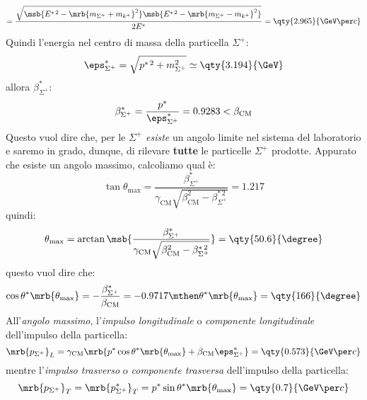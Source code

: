\begin{example}
\begin{enumerate}
\begin{equation}
			      = \frac{\sqrt{
					      \msb{E ^{\ast\,2} - \mrb{m _{\Sigma^+} + m _{k^+}}^{2}}
					      \msb{E ^{\ast\,2} - \mrb{m _{\Sigma^+} - m _{k^+}}^{2}}
				      }}{2 E^\ast} = \qty{2.965}{\GeV \per c}
		      \end{equation}
		      Quindi l'energia nel centro di massa della particella $\Sigma^+$:
		      \begin{equation}
			      \eps ^{\ast}_{\Sigma^+}
			      = \sqrt{p ^{\ast\,2} + m^2 _{\Sigma^+}}
			      \simeq \qty{3.194}{\GeV}
		      \end{equation}
		      allora $\beta ^{\ast}_{\Sigma^+}$:
		      \begin{equation}
			      \beta ^{\ast}_{\Sigma^+}
			      = \frac{p^\ast}{\eps ^{\ast}_{\Sigma^+}}
			      = 0.9283
			      < \beta _{\text{CM}}
		      \end{equation}
		      Questo vuol dire che, per le $\Sigma^+$ \textit{esiste} un angolo
		      limite nel sistema del laboratorio e saremo in grado, dunque, di
		      rilevare \textbf{tutte} le particelle $\Sigma^+$ prodotte.
		      Appurato che esiste un angolo massimo, calcoliamo qual è:
		      \begin{equation}
			      \tan \theta _\text{max}
			      = \frac{\beta _{\Sigma^+}^{\ast}}{
				      \gamma _\text{CM} \sqrt{\beta _\text{CM}^{2}
					      - \beta ^{\ast\,2} _{\Sigma^+}}
			      }
			      = 1.217
		      \end{equation}
		      quindi:
		      \begin{equation}
			      \theta _\text{max}
			      = \arctan \msb{\frac{\beta _{\Sigma^+}^{\ast}}
				      {\gamma _\text{CM} \sqrt{\beta _\text{CM}^{2}
						      - \beta ^{\ast\,2} _{\Sigma^+}}}}
			      = \qty{50.6}{\degree}
		      \end{equation}
		      questo vuol dire che:
		      \begin{equation}
			      \cos \theta^\ast \mrb{\theta _\text{max}}
			      = - \frac{\beta _{\Sigma^+}^{\ast}}{\beta _\text{CM}}
			      = -0.9717
			      \mthen
			      \theta^\ast \mrb{\theta _\text{max}} = \qty{166}{\degree}
		      \end{equation}
		      All'\textit{angolo massimo}, l'\textit{impulso longitudinale} o
		      \textit{componente longitudinale} dell'impulso della particella:
		      \begin{equation}
			      \mrb{p _{\Sigma^+}}_{L}
			      = \gamma _\text{CM} \mrb{
				      p ^{\ast} \cos \theta^\ast \mrb{\theta _\text{max}}
				      + \beta _\text{CM} \eps _{\Sigma^+}^{\ast}
			      }
			      = \qty{0.573}{\GeV \per c}
		      \end{equation}
		      mentre l'\textit{impulso trasverso} o \textit{componente trasversa}
		      dell'impulso della particella:
		      \begin{equation}
			      \mrb{p _{\Sigma^+}}_{T}
			      = \mrb{p _{\Sigma^+}^{\ast}}_{T}
			      = p ^{\ast} \sin \theta^\ast \mrb{\theta _\text{max}}
			      = \qty{0.7}{\GeV \per c}
		      \end{equation}


\end{enumerate}
\end{example}
